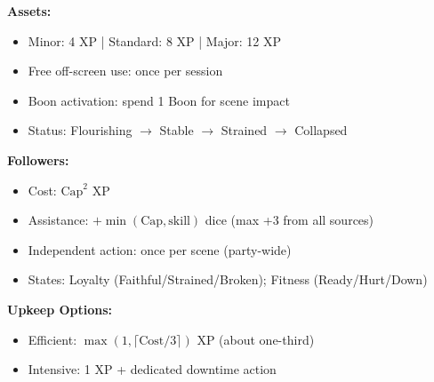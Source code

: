 \begin{tcolorbox}[colback=blue!5!white,colframe=blue!75!black,title={Assets and Followers Quick Reference},fonttitle=\bfseries,breakable]
\textbf{Assets:}
\begin{itemize}
\item Minor: 4 XP \;|\; Standard: 8 XP \;|\; Major: 12 XP
\item Free off-screen use: once per session
\item Boon activation: spend 1 Boon for scene impact
\item Status: Flourishing $\rightarrow$ Stable $\rightarrow$ Strained $\rightarrow$ Collapsed
\end{itemize}

\textbf{Followers:}
\begin{itemize}
\item Cost: $\text{Cap}^2$ XP
\item Assistance: $+\min(\text{Cap},\text{skill})$ dice (max +3 from all sources)
\item Independent action: once per scene (party-wide)
\item States: Loyalty (Faithful/Strained/Broken); Fitness (Ready/Hurt/Down)
\end{itemize}

\textbf{Upkeep Options:}
\begin{itemize}
\item Efficient: $\max(1,\lceil\text{Cost}/3\rceil)$ XP (about one-third)
\item Intensive: 1 XP + dedicated downtime action
\end{itemize}
\end{tcolorbox}